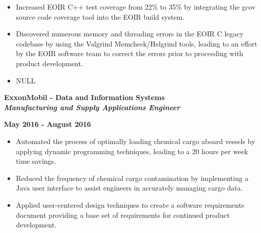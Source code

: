 \documentclass[10pt,letterpaper]{article}
\begin{document}
\begin{itemize}[noitemsep,topsep=0pt]
        \setlength\itemsep{-0.10em}
        \item Increased EOIR C++ test coverage from 22\% to 35\% by integrating the gcov
              source code coverage tool into the EOIR build system.
        \item Discovered numerous memory and threading errors in the EOIR C legacy codebase
              by using the Valgrind Memcheck/Helgrind tools, leading to an effort by the EOIR
              software team to correct the errors prior to proceeding with product development.
        \item NULL
\end{itemize}

\medskip

\begin{minipage}[t]{0.53\textwidth}
        \begin{flushleft}
                \textbf{ExxonMobil - Data and Information Systems}\\
                \textbf{\textit{Manufacturing and Supply Applications Engineer}}\\
        \end{flushleft}
\end{minipage}
\begin{minipage}[t]{0.44\textwidth}
        \begin{flushright}
                \textbf{May 2016 - August 2016}
        \end{flushright}
\end{minipage}

\begin{itemize}[noitemsep,topsep=0pt]
        \setlength\itemsep{-0.10em}
        \item Automated the process of optimally loading chemical cargo aboard
              vessels by applying dynamic programming techniques, leading to a 20
              hours per week time savings.
        \item Reduced the frequency of chemical cargo contamination by implementing
              a Java user interface to assist engineers in accurately managing cargo data.
        \item Applied user-centered design techniques to create a software
              requirements document providing a base set of requirements for continued
              product development.
\end{itemize}

\medskip
\end{document}
